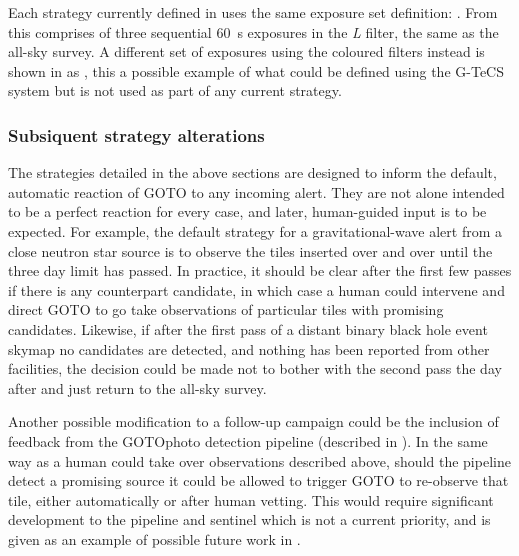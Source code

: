 \begin{colsection}
Each strategy currently defined in  uses the same exposure set definition: . From  this comprises of three sequential \SI{60}{\second} exposures in the \textit{L} filter, the same as the all-sky survey. A different set of exposures using the coloured filters instead is shown in  as , this a possible example of what could be defined using the G-TeCS system  but is not used as part of any current strategy.  %

\subsubsection{Subsiquent strategy alterations}

The strategies detailed in the above sections are designed to inform the default, automatic reaction of GOTO to any incoming alert. They are not alone intended to be a perfect reaction for every case, and later, human-guided input is to be expected. For example, the default strategy for a gravitational-wave alert from a close neutron star source is to observe the tiles inserted over and over until the three day limit has passed. In practice, it should be clear after the first few passes if there is any counterpart candidate, in which case a human could intervene and direct GOTO to go take observations of particular tiles with promising candidates. Likewise, if after the first pass of a distant binary black hole event skymap no candidates are detected, and nothing has been reported from other facilities, the decision could be made not to bother with the second pass the day after and just return to the all-sky survey.

Another possible modification to a follow-up campaign could be the inclusion of feedback from the GOTOphoto detection pipeline (described in ). In the same way as a human could take over observations described above, should the pipeline detect a promising source it could be allowed to trigger GOTO to re-observe that tile, either automatically or after human vetting. This would require significant development to the pipeline and sentinel which is not a current priority, and is given as an example of possible future work in .

\end{colsection}


